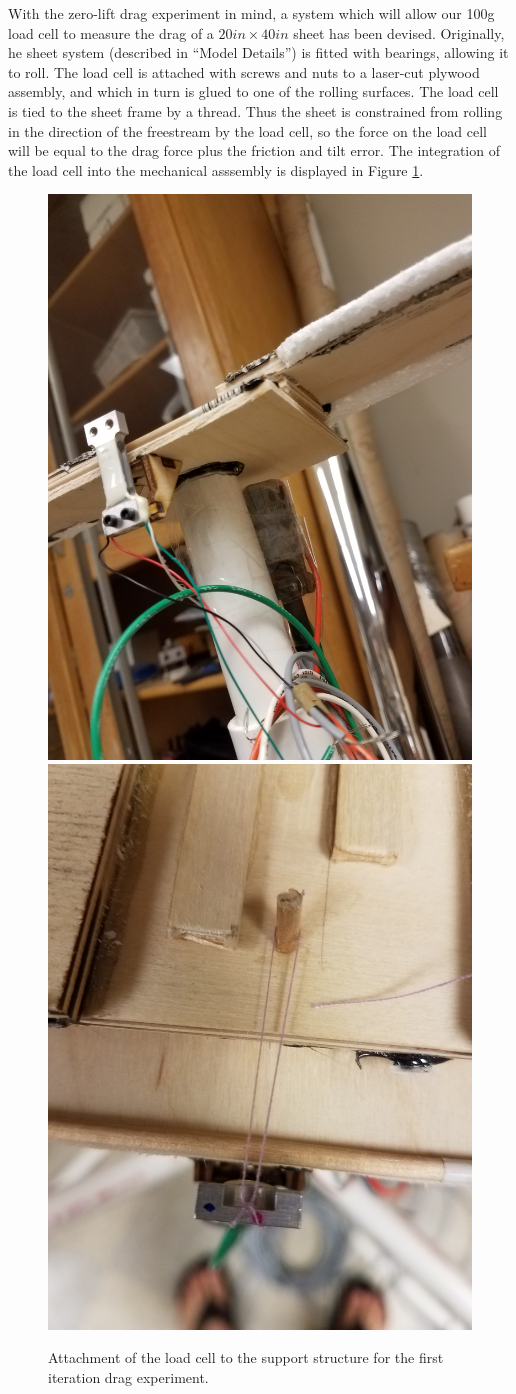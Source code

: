 \documentclass[12pt]{report} %
\begin{document}
With the zero-lift drag experiment in mind, a system which will allow our 100g load cell to measure the drag of a $20 in \times
40 in$ sheet has been devised. Originally, he sheet system (described in ``Model Details'') is fitted with bearings, allowing it to roll.
The load cell is attached with screws and nuts to a laser-cut plywood assembly, and which in turn is glued to one of the rolling
surfaces. The load cell is tied to the sheet frame by a thread. Thus the sheet is constrained
from rolling in the direction of the freestream by the load cell, so the force on the load cell will be equal to the drag force
plus the friction and tilt error. The integration of the load cell into the mechanical asssembly is displayed in Figure \ref{load_cell}.

\begin{figure}
\includegraphics[angle = -90, width = 0.49\linewidth]{load_cell_insertion.jpg}
\includegraphics[angle = -90, width = 0.49\linewidth]{load_transfer.jpg}
\centering
\caption{Attachment of the load cell to the support structure for the first iteration drag experiment.}
\label{load_cell}
\end{figure}
\end{document}
